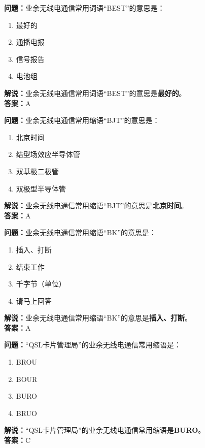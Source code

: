 \bigskip


\noindent\textbf{问题：}业余无线电通信常用词语“BEST”的意思是：
\begin{enumerate}[label=\Alph*), leftmargin=3em]
\item 最好的
\item 通播电报
\item 信号报告
\item 电池组
\end{enumerate}
\noindent\textbf{解说：}业余无线电通信常用词语“BEST”的意思是\textbf{最好的}。\\\noindent\textbf{答案：}A

\bigskip


\noindent\textbf{问题：}业余无线电通信常用缩语“BJT”的意思是：
\begin{enumerate}[label=\Alph*), leftmargin=3em]
\item 北京时间
\item 结型场效应半导体管
\item 双基极二极管
\item 双极型半导体管
\end{enumerate}
\noindent\textbf{解说：}业余无线电通信常用缩语“BJT”的意思是\textbf{北京时间}。\\\noindent\textbf{答案：}A


\bigskip


\noindent\textbf{问题：}业余无线电通信常用缩语“BK”的意思是：
\begin{enumerate}[label=\Alph*), leftmargin=3em]
\item 插入、打断
\item 结束工作
\item 千字节（单位）
\item 请马上回答
\end{enumerate}
\noindent\textbf{解说：}业余无线电通信常用缩语“BK”的意思是\textbf{插入、打断}。\\\noindent\textbf{答案：}A

\bigskip


\noindent\textbf{问题：}“QSL卡片管理局”的业余无线电通信常用缩语是：
\begin{enumerate}[label=\Alph*), leftmargin=3em]
\item BROU
\item BOUR
\item BURO
\item BRUO
\end{enumerate}
\noindent\textbf{解说：}“QSL卡片管理局”的业余无线电通信常用缩语是\textbf{BURO}。\\\noindent\textbf{答案：}C%

